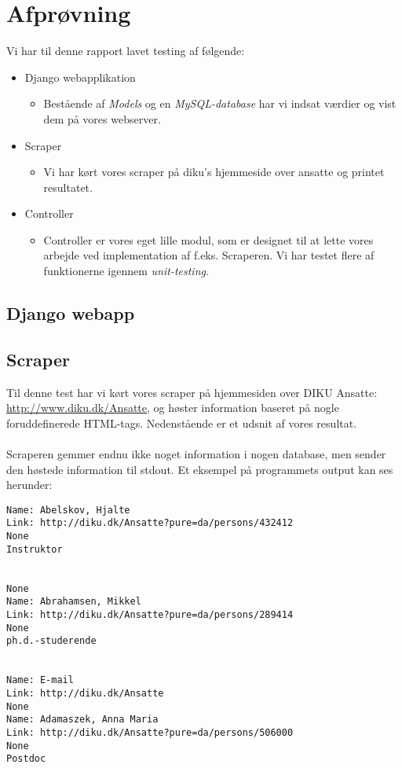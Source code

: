 \documentclass[11pt]{article}
\begin{document}
\section{Afprøvning}
Vi har til denne rapport lavet testing af følgende:
\begin{itemize}
\item Django webapplikation
	\begin{itemize}
	\item Bestående af \textit{Models} og en \textit{MySQL-database} har vi indsat værdier og vist dem på vores webserver.
	\end{itemize}
\item Scraper
	\begin{itemize}
	\item Vi har kørt vores scraper på diku's hjemmeside over ansatte og printet resultatet.
	\end{itemize}
\item Controller
	\begin{itemize}
	\item Controller er vores eget lille modul, som er designet til at lette vores arbejde ved implementation af f.eks. Scraperen. Vi har testet flere af funktionerne igennem \textit{unit-testing}.
	\end{itemize}
\end{itemize}
\subsection{Django webapp}
\subsection{Scraper}
Til denne test har vi kørt vores scraper på hjemmesiden over DIKU Ansatte: \url{http://www.diku.dk/Ansatte}, og høster information baseret på nogle foruddefinerede HTML-tags. Nedenstående er et udsnit af vores resultat. \\ \\
Scraperen gemmer endnu ikke noget information i nogen database, men sender den høstede information til stdout. Et eksempel på programmets output kan ses herunder:
\begin{lstlisting}
Name: Abelskov, Hjalte
Link: http://diku.dk/Ansatte?pure=da/persons/432412
None
Instruktor


None
Name: Abrahamsen, Mikkel
Link: http://diku.dk/Ansatte?pure=da/persons/289414
None
ph.d.-studerende


Name: E-mail
Link: http://diku.dk/Ansatte
None
Name: Adamaszek, Anna Maria
Link: http://diku.dk/Ansatte?pure=da/persons/506000
None
Postdoc
\end{lstlisting}
\end{document}
